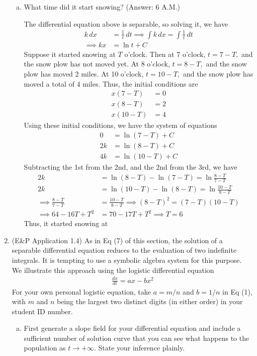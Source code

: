 \documentclass{article}
\begin{document}
\begin{enumerate}
\begin{enumerate}[(a)]
			\item What time did it start snowing? (Answer: 6 A.M.)
				\begin{soln}
					The differential equation above is separable, so solving it, we have
					\begin{align*}
						k\, dx &= \frac{1}{t}\, dt \implies \int k\, dx = \int \frac{1}{t}\, dt \\
						\implies kx &= \ln t + C
					\end{align*}
					Suppose it started snowing at $T$ o'clock. Then at 7 o'clock, $t=7-T,$ and the snow plow has not moved yet. At 8 o'clock, $t=8-T,$ and the snow plow has moved 2 miles. At 10 o'clock, $t=10-T,$ and the snow plow has moved a total of 4 miles. Thus, the initial conditions are
					\begin{align*}
						x(7-T) &= 0 \\
						x(8-T) &= 2 \\
						x(10-T) &= 4
					\end{align*}
					Using these initial conditions, we have the system of equations
					\begin{align*}
						0 &= \ln (7-T) + C \\
						2k &= \ln (8-T) + C \\
						4k &= \ln(10-T) + C
					\end{align*}
					Subtracting the 1st from the 2nd, and the 2nd from the 3rd, we have
					\begin{align*}
						2k &= \ln (8-T) - \ln (7-T) = \ln \frac{8-T}{7-T} \\
						2k &= \ln (10-T) - \ln(8-T) = \ln \frac{10-T}{8-T} \\
						\implies \frac{8-T}{7-T} &= \frac{10-T}{8-T} \implies (8-T)^2 = (7-T)(10-T) \\
						\implies 64-16T+T^2 &= 70-17T+T^2 \implies T = 6
					\end{align*}
					Thus, it started snowing at 
				\end{soln}
				
		\end{enumerate}

	\item (E\&P Application 1.4) As in Eq (7) of this section, the solution of a separable differential equation reduces to the evaluation of two indefinite integrals. It is tempting to use a symbolic algebra system for this purpose. We illustrate this approach using the logistic differential equation
		\begin{align*}
			\frac{dx}{dt} = ax-bx^2 \tag{1}
		\end{align*}
		For your own personal logistic equation, take $a=m/n$ and $b=1/n$ in Eq (1), with $m$ and $n$ being the largest two distinct digits (in either order) in your student ID number.
		\begin{enumerate}[(a)]
			\item First generate a slope field for your differential equation and include a sufficient number of solution curve that you can see what happens to the population as $t\to+\infty.$ State your inference plainly.


\end{enumerate}
\end{enumerate}
\end{document}
